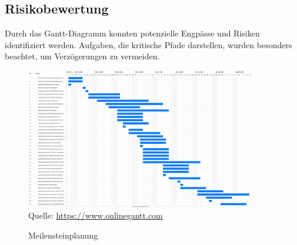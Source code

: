 \subsection{Risikobewertung}
Durch das Gantt-Diagramm konnten potenzielle Engpässe und Risiken identifiziert werden. Aufgaben, die kritische Pfade darstellen, wurden besonders beachtet, um Verzögerungen zu vermeiden.

\begin{figure}[H]
    \caption[Meilensteinplanung]{Meilensteinplanung}
    \includegraphics[width=0.9\textwidth]{assets/figures/STH GANTT Diagramm.png}
    \\
    Quelle: \url{https://www.onlinegantt.com}

\end{figure}
